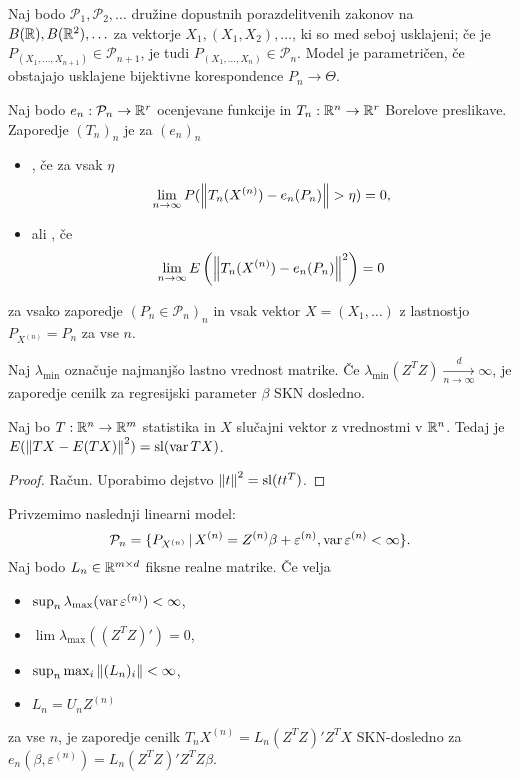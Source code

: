 Naj bodo $\mathcal{P}_1, \mathcal{P}_2, \ldots$ družine dopustnih
porazdelitvenih zakonov na $B(\mathbb{R}), B(\mathbb{R}^2), \ldots$ za vektorje $X_1, (X_1,
X_2), \ldots$, ki so med seboj usklajeni; če je $P_{(X_1, \ldots, X_{n+1})} \in
\mathcal{P}_{n+1}$, je tudi $P_{(X_1, \ldots, X_n)} \in \mathcal{P}_n$.
Model je parametričen, če obstajajo usklajene bijektivne korespondence $P_n \to
\Theta$.

\begin{definicija}
  Naj bodo $e_n: \mathcal{P}_n \to \mathbb{R}^r$ ocenjevane funkcije in $T_n: \mathbb{R}^n \to
  \mathbb{R}^r$ Borelove preslikave.
  Zaporedje $(T_n)_n$ je za $(e_n)_n$
  \begin{itemize}
  \item {}, če za vsak $\eta$
	\[
	  \lim_{n \to \infty} P(\left\lVert T_n(X^{(n)}) - e_n(P_n)\right\rVert > \eta) = 0,
	\]
  \item {} ali , če
	\[
	  \lim_{n \to \infty} E\left(\left\lVert T_n(X^{(n)}) - e_n(P_n)\right\rVert^2\right) = 0
	\]
  \end{itemize}
  za vsako zaporedje $(P_n \in \mathcal{P}_n)_n$ in vsak vektor $X = (X_1,
  \ldots)$ z lastnostjo $P_{X^{(n)}} = P_n$ za vse $n$.
\end{definicija}

\begin{izrek}
  Naj $\lambda_{\text{min}}$ označuje najmanjšo lastno vrednost matrike.
  Če $\lambda_{\text{min}}(Z^T Z) \xrightarrow[n \to \infty]{d}
  \infty$, je zaporedje cenilk za regresijski parameter $\beta$ SKN dosledno.
\end{izrek}

\begin{trditev}
  Naj bo $T: \mathbb{R}^n \to \mathbb{R}^m$ statistika in $X$ slučajni vektor z vrednostmi v
  $\mathbb{R}^n$.
  Tedaj je $E(\left\lVert TX - E(TX)\right\rVert^2) = \operatorname{sl}(\operatorname{var} TX)$.
\end{trditev}

\begin{proof}
  Račun.
  Uporabimo dejstvo $\left\lVert t\right\rVert^2 = \operatorname{sl}(t t^T)$.
\end{proof}

\begin{izrek}
  Privzemimo naslednji linearni model:
  \[
	\mathcal{P}_n = \{ P_{X^{(n)}} \,|\, X^{(n)} = Z^{(n)} \beta +
	\varepsilon^{(n)}, \operatorname{var} \varepsilon^{(n)} < \infty \}.
  \]
  Naj bodo $L_n \in \mathbb{R}^{m \times d}$ fiksne realne matrike.
  Če velja
  \begin{itemize}
  \item $\sup_n \lambda_{\text{max}}(\operatorname{var} \varepsilon^{(n)}) < \infty$,
  \item $\lim \lambda_{\text{max}}((Z^T Z)') = 0$,
  \item $\sup_n \max_i \left\lVert(L_n)_i\right\rVert < \infty$,
  \item $L_n = U_n Z^{(n)}$
  \end{itemize}
  za vse $n$, je zaporedje cenilk $T_n X^{(n)} = L_n(Z^T Z)' Z^T X$ SKN-dosledno
  za $e_n(\beta, \varepsilon^{(n)}) = L_n (Z^T Z)' Z^T Z \beta$.
\end{izrek}

